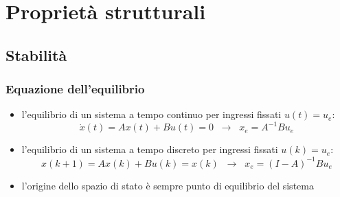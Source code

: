 \section{Proprietà strutturali}
\subsection{Stabilità}
\subsubsection*{Equazione dell'equilibrio}
\begin{itemize}
	\item l'equilibrio di un sistema a tempo continuo per ingressi fissati \(u(t) = u_e\):
	\[\dot{x}(t) = Ax(t) + Bu(t) = 0 \;\; \rightarrow \;\; x_e = A^{-1} Bu_e\]
	\item l'equilibrio di un sistema a tempo discreto per ingressi fissati \(u(k) = u_e\):
	\[x(k+1) = Ax(k) + Bu(k) = x(k) \;\; \rightarrow \;\; x_e = (I-A)^{-1} Bu_e\]
	\item l'origine dello spazio di stato è sempre punto di equilibrio del sistema
\end{itemize}

